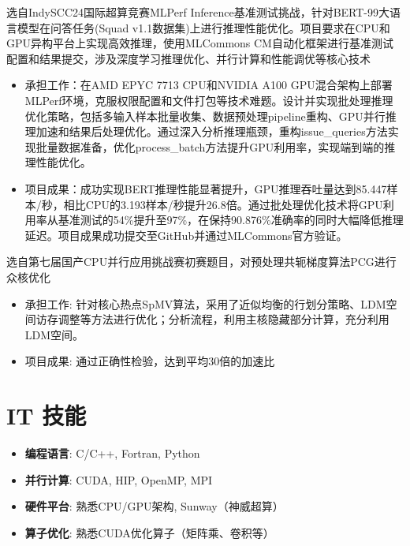 \documentclass{resume}
\begin{document}
选自IndySCC24国际超算竞赛MLPerf Inference基准测试挑战，针对BERT-99大语言模型在问答任务(Squad v1.1数据集)上进行推理性能优化。项目要求在CPU和GPU异构平台上实现高效推理，使用MLCommons CM自动化框架进行基准测试配置和结果提交，涉及深度学习推理优化、并行计算和性能调优等核心技术
\begin{itemize}
  \item 承担工作：在AMD EPYC 7713 CPU和NVIDIA A100 GPU混合架构上部署MLPerf环境，克服权限配置和文件打包等技术难题。设计并实现批处理推理优化策略，包括多输入样本批量收集、数据预处理pipeline重构、GPU并行推理加速和结果后处理优化。通过深入分析推理瓶颈，重构issue\_queries方法实现批量数据准备，优化process\_batch方法提升GPU利用率，实现端到端的推理性能优化。
  \item 项目成果：成功实现BERT推理性能显著提升，GPU推理吞吐量达到85.447样本/秒，相比CPU的3.193样本/秒提升26.8倍。通过批处理优化技术将GPU利用率从基准测试的54\%提升至97\%，在保持90.876\%准确率的同时大幅降低推理延迟。项目成果成功提交至GitHub并通过MLCommons官方验证。
\end{itemize}

选自第七届国产CPU并行应用挑战赛初赛题目，对预处理共轭梯度算法PCG进行众核优化
\begin{itemize}
  \item 承担工作: 针对核心热点SpMV算法，采用了近似均衡的行划分策略、LDM空间访存调整等方法进行优化；分析流程，利用主核隐藏部分计算，充分利用LDM空间。
  \item 项目成果: 通过正确性检验，达到平均30倍的加速比
\end{itemize}

\section{IT 技能}
\begin{itemize}[parsep=0.5ex]
  \item \textbf{编程语言}: C/C++, Fortran, Python
  \item \textbf{并行计算}: CUDA, HIP, OpenMP, MPI
  \item \textbf{硬件平台}: 熟悉CPU/GPU架构, Sunway（神威超算）
  \item \textbf{算子优化}: 熟悉CUDA优化算子（矩阵乘、卷积等）
\end{itemize}
\end{document}
